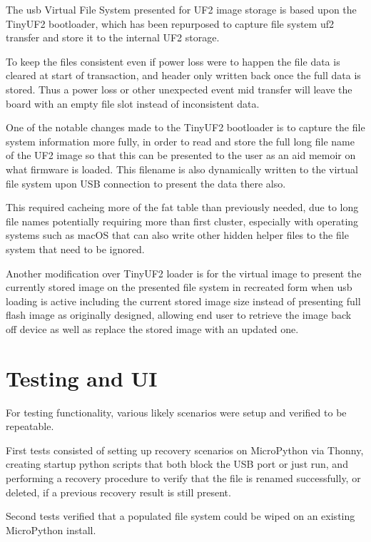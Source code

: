 The \gls{usb} Virtual File System presented for UF2 image storage is based upon the TinyUF2 bootloader\cite{TinyUF2Bootloader2023}, which has been repurposed to capture file system uf2 transfer and store it to the internal UF2 storage.

To keep the files consistent even if power loss were to happen the file data is cleared at start of transaction, and header only written back once the full data is stored. Thus a power loss or other unexpected event mid transfer will leave the board with an empty file slot instead of inconsistent data.

One of the notable changes made to the TinyUF2 bootloader is to capture the file system information more fully, in order to read and store the full long file name of the UF2 image so that this can be presented to the user as an aid memoir on what firmware is loaded. This filename is also dynamically written to the virtual file system upon USB connection to present the data there also.

This required cacheing more of the \gls{fat} table than previously needed, due to long file names potentially requiring more than first cluster, especially with operating systems such as macOS that can also write other hidden helper files to the file system that need to be ignored.

Another modification over TinyUF2 loader is for the virtual image to present the currently stored image on the presented file system in recreated form when \gls{usb} loading is active including the current stored image size instead of presenting full flash image as originally designed, allowing end user to retrieve the image back off device as well as replace the stored image with an updated one.

\pagebreak
\section{Testing and UI}

For testing functionality, various likely scenarios were setup and verified to be repeatable.

First tests consisted of setting up recovery scenarios on MicroPython via Thonny\cite{ThonnyPythonIDE}, creating startup python scripts that both block the USB port or just run, and performing a recovery procedure to verify that the file is renamed successfully, or deleted, if a previous recovery result is still present.

Second tests verified that a populated file system could be wiped on an existing MicroPython install.

